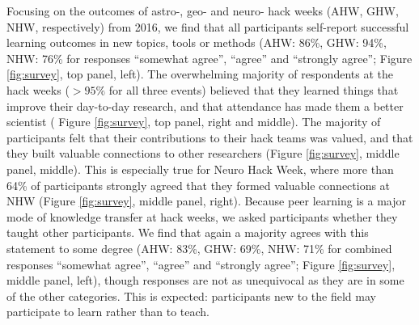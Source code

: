Focusing on the outcomes of astro-, geo- and neuro- hack weeks (AHW, GHW, NHW, respectively) from 2016, we find that all participants self-report successful learning outcomes in new topics, tools or methods (AHW: 86\%, GHW: 94\%, NHW: 76\% for responses ``somewhat agree'', ``agree'' and ``strongly agree''; Figure \ref{fig:survey}, top panel, left).
The overwhelming majority of respondents at the hack weeks ($>95\%$ for all three events) believed that they learned things that improve their day-to-day research, and that attendance has made them a better scientist ( Figure \ref{fig:survey}, top panel, right and middle).
The majority of participants felt that their contributions to their hack teams was valued, and that they built valuable connections to other researchers (Figure \ref{fig:survey}, middle panel, middle).
This is especially true for Neuro Hack Week, where more than 64\% of participants strongly agreed that they formed valuable connections at NHW (Figure  \ref{fig:survey}, middle panel, right).
Because peer learning is a major mode of knowledge transfer at hack weeks, we asked participants whether they taught other participants.
We find that again a majority agrees with this statement to some degree (AHW: 83\%, GHW: 69\%, NHW: 71\% for combined responses ``somewhat agree'', ``agree'' and ``strongly agree''; Figure \ref{fig:survey}, middle panel, left), though responses are not as unequivocal as they are in some of the other categories.
This is expected: participants new to the field may participate to learn rather than to teach.


